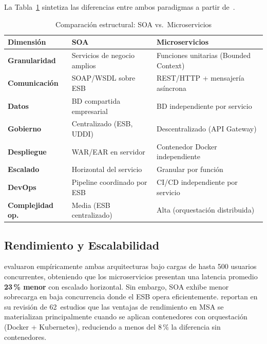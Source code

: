\documentclass[conference,a4paper]{IEEEtran}
\begin{document}
La Tabla~\ref{tab:comparacion} sintetiza las diferencias entre
ambos paradigmas a partir
de~\cite{velepucha2023,blinowski2022,aksakalli2021,newman2021,waseem2021}.

\begin{table}[H]
\centering
\caption{Comparaci\'on estructural: SOA vs.\ Microservicios}
\label{tab:comparacion}
\renewcommand{\arraystretch}{1.25}
\begin{tabularx}{\columnwidth}{>{\bfseries\footnotesize}p{1.75cm}
                               >{\footnotesize}X >{\footnotesize}X}
\toprule
\textbf{Dimensi\'on} & \textbf{SOA} & \textbf{Microservicios} \\
\midrule
Granularidad   & Servicios de negocio amplios & Funciones unitarias (Bounded Context) \\
\addlinespace
Comunicaci\'on & SOAP/WSDL sobre ESB          & REST/HTTP + mensajer\'ia as\'incrona \\
\addlinespace
Datos          & BD compartida empresarial     & BD independiente por servicio \\
\addlinespace
Gobierno       & Centralizado (ESB, UDDI)      & Descentralizado (API Gateway) \\
\addlinespace
Despliegue     & WAR/EAR en servidor           & Contenedor Docker independiente \\
\addlinespace
Escalado       & Horizontal del servicio       & Granular por funci\'on \\
\addlinespace
DevOps         & Pipeline coordinado por ESB   & CI/CD independiente por servicio \\
\addlinespace
Complejidad op.& Media (ESB centralizado)      & Alta (orquestaci\'on distribuida) \\
\bottomrule
\end{tabularx}
\end{table}

\subsection{Rendimiento y Escalabilidad}

\textcite{blinowski2022} evaluaron emp\'iricamente ambas arquitecturas
bajo cargas de hasta 500 usuarios concurrentes, obteniendo que
los microservicios presentan una latencia promedio \textbf{23\,\%
menor} con escalado horizontal. Sin embargo, SOA exhibe menor
sobrecarga en baja concurrencia donde el ESB opera eficientemente.
\textcite{aksakalli2021} reportan en su revisi\'on de 62~estudios
que las ventajas de rendimiento en MSA se materializan
principalmente cuando se aplican contenedores con orquestaci\'on
(Docker + Kubernetes), reduciendo a menos del 8\,\% la diferencia
sin contenedores.
\end{document}
